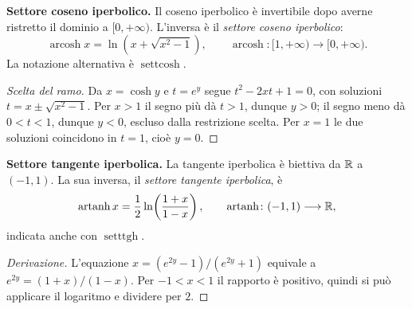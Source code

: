 \textbf{Settore coseno iperbolico.} Il coseno iperbolico è invertibile dopo averne ristretto il dominio a $[0,+\infty)$. L'inversa è il \emph{settore coseno iperbolico}:
\[
\operatorname{arcosh}x=\ln\!\left(x+\sqrt{x^2-1}\right),
\qquad \operatorname{arcosh}\colon[1,+\infty)\longrightarrow[0,+\infty).
\]
La notazione alternativa è $\operatorname{settcosh}$.

\begin{proof}[Scelta del ramo]
Da $x=\cosh y$ e $t=e^y$ segue $t^2-2xt+1=0$, con soluzioni $t=x\pm\sqrt{x^2-1}$. Per $x>1$ il segno più dà $t>1$, dunque $y>0$; il segno meno dà $0<t<1$, dunque $y<0$, escluso dalla restrizione scelta. Per $x=1$ le due soluzioni coincidono in $t=1$, cioè $y=0$.
\end{proof}

\textbf{Settore tangente iperbolica.} La tangente iperbolica è biettiva da $\mathbb{R}$ a $(-1,1)$. La sua inversa, il \emph{settore tangente iperbolica}, è
\[
\operatorname{artanh}x=\frac12\ln\!\left(\frac{1+x}{1-x}\right),
\qquad \operatorname{artanh}\colon(-1,1)\longrightarrow\mathbb{R},
\]
indicata anche con $\operatorname{setttgh}$.

\begin{proof}[Derivazione]
L'equazione $x=(e^{2y}-1)/(e^{2y}+1)$ equivale a $e^{2y}=(1+x)/(1-x)$. Per $-1<x<1$ il rapporto è positivo, quindi si può applicare il logaritmo e dividere per $2$.
\end{proof}


